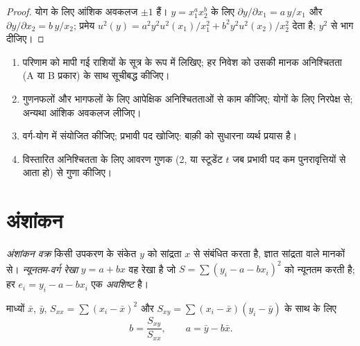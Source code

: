 \begin{proof}
योग के लिए आंशिक अवकलज $\pm1$ हैं। $y = x_1^ax_2^b$ के लिए $\partial y/\partial x_1 =
a\,y/x_1$ और $\partial y/\partial x_2 = b\,y/x_2$; प्रमेय $u^2(y) = a^2y^2u^2(x_1)/x_1^2 +
b^2y^2u^2(x_2)/x_2^2$ देता है; $y^2$ से भाग दीजिए।
\end{proof}

\begin{method}[संचरण]\label{met:b2:measurement-statistics:propagate}
\begin{enumerate}
  \item परिणाम को मापी गई राशियों के सूत्र के रूप में लिखिए; हर निवेश को उसकी मानक
        अनिश्चितता (A या B प्रकार) के साथ सूचीबद्ध कीजिए।
  \item गुणनफलों और भागफलों के लिए आपेक्षिक अनिश्चितताओं से काम कीजिए; योगों के लिए निरपेक्ष से;
        अन्यथा आंशिक अवकलज लीजिए।
  \item वर्ग-योग में संयोजित कीजिए; प्रभावी पद खोजिए: बाक़ी को सुधारना व्यर्थ प्रयास है।
  \item विस्तारित अनिश्चितता के लिए आवरण गुणक (2, या स्टूडेंट $t$ जब प्रभावी पद कम
        पुनरावृत्तियों से आता हो) से गुणा कीजिए।
\end{enumerate}
\end{method}

\section{अंशांकन}

\begin{definition}[अंशांकन वक्र]\label{def:b2:measurement-statistics:calibration}
\emph{अंशांकन वक्र} किसी उपकरण के संकेत $y$ को
सांद्रता $x$ से संबंधित करता है, ज्ञात सांद्रता वाले मानकों से। \emph{न्यूनतम-वर्ग
रेखा} $y = a + bx$ वह रेखा है जो $S = \sum (y_i - a -
bx_i)^2$ को न्यूनतम करती है; हर $e_i = y_i - a - bx_i$ एक \emph{अवशिष्ट} है।
\end{definition}

\begin{theorem}[न्यूनतम-वर्ग रेखा]\label{thm:b2:measurement-statistics:least-squares}
माध्यों $\bar x$, $\bar y$, $S_{xx} = \sum(x_i - \bar x)^2$ और $S_{xy} = \sum(x_i - \bar x)(y_i -
\bar y)$ के साथ  के लिए
\begin{equation*}
b = \frac{S_{xy}}{S_{xx}}, \qquad a = \bar y - b\bar x.
\end{equation*}
\end{theorem}

